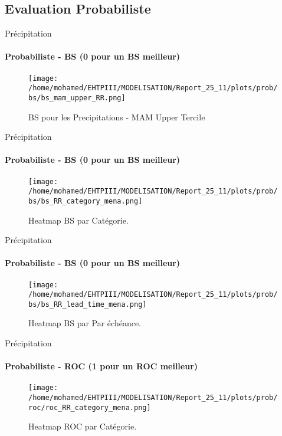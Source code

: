 \subsection{Evaluation Probabiliste}

\begin{frame}{Précipitation}
\framesubtitle{Probabiliste - BS (0 pour un BS meilleur)}

\begin{figure}
    \centering
    \texttt{[image: /home/mohamed/EHTPIII/MODELISATION/Report\_25\_11/plots/prob/bs/bs\_mam\_upper\_RR.png]}
    \caption{BS pour les Precipitations - MAM  Upper Tercile }
    \label{fig:enter-label}
\end{figure}
\end{frame}

\begin{frame}{Précipitation}
\framesubtitle{Probabiliste - BS (0 pour un BS meilleur)}

\begin{figure}
    \centering
    \texttt{[image: /home/mohamed/EHTPIII/MODELISATION/Report\_25\_11/plots/prob/bs/bs\_RR\_category\_mena.png]}
    \caption{Heatmap BS par Catégorie.  }
    \label{fig:enter-label}
\end{figure}
\end{frame}


\begin{frame}{Précipitation}
\framesubtitle{Probabiliste - BS (0 pour un BS meilleur)}

\begin{figure}
    \centering
    \texttt{[image: /home/mohamed/EHTPIII/MODELISATION/Report\_25\_11/plots/prob/bs/bs\_RR\_lead\_time\_mena.png]}
    \caption{Heatmap BS par Par échéance.}
    \label{fig:enter-label}
\end{figure}
\end{frame}




\begin{frame}{Précipitation}
\framesubtitle{Probabiliste - ROC (1 pour un ROC meilleur)}

\begin{figure}
    \centering
    \texttt{[image: /home/mohamed/EHTPIII/MODELISATION/Report\_25\_11/plots/prob/roc/roc\_RR\_category\_mena.png]}
    \caption{Heatmap ROC par Catégorie.  }
    \label{fig:enter-label}
\end{figure}
\end{frame}

